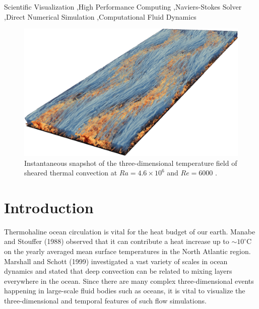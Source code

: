 \documentclass[final,5p,times,twocolumn]{elsarticle}
\begin{document}
\begin{frontmatter}
\begin{abstract}
\end{abstract}

\begin{keyword}

Scientific Visualization \sep High Performance Computing \sep Naviers-Stokes Solver \sep Direct Numerical Simulation \sep Computational Fluid Dynamics

\end{keyword}

\end{frontmatter}


\begin{figure}[!hbt]
	\centering
	\includegraphics[width=\linewidth]{flowfield}%
	\caption{\label{fig:flowfield} Instantaneous snapshot of the three-dimensional temperature field of sheared thermal convection at $ Ra=4.6 \times 10^6 $ and $ Re=6000 $ \cite{bla18}.}
\end{figure}

\section{Introduction}
\label{sec:Introduction}

Thermohaline ocean circulation \cite{rah00} is vital for the heat budget of our earth. Manabe and Stouffer (1988) \cite{man88} observed that it can contribute a heat increase up to $ \sim 10 ^ \circ $C on the yearly averaged mean surface temperatures in the North Atlantic region. Marshall and Schott (1999) \cite{mar99} investigated a vast variety of scales in ocean dynamics and stated that deep convection can be related to mixing layers everywhere in the ocean. Since there are many complex three-dimensional events happening in large-scale fluid bodies such as oceans, it is vital to visualize the three-dimensional and temporal features of such flow simulations.
\end{document}
